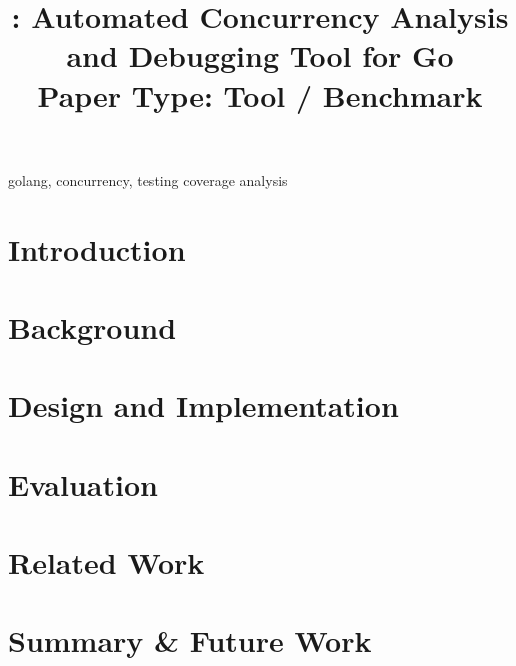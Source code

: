\documentclass[conference]{IEEEtran}
\begin{document}
\title{\goat: Automated Concurrency Analysis and Debugging Tool for Go\\Paper Type: Tool / Benchmark}



\maketitle

\begin{abstract}

\end{abstract}

\begin{IEEEkeywords}
golang, concurrency, testing coverage analysis
\end{IEEEkeywords}


%

\section{Introduction}
\label{sec:intro}



\section{Background}
\label{sec:bg}


\section{Design and Implementation}
\label{sec:design}


\section{Evaluation}
\label{sec:evaluation}


%


\section{Related Work}
\label{sec:related}



\section{Summary \& Future Work}
\label{sec:summary}





\end{document}

